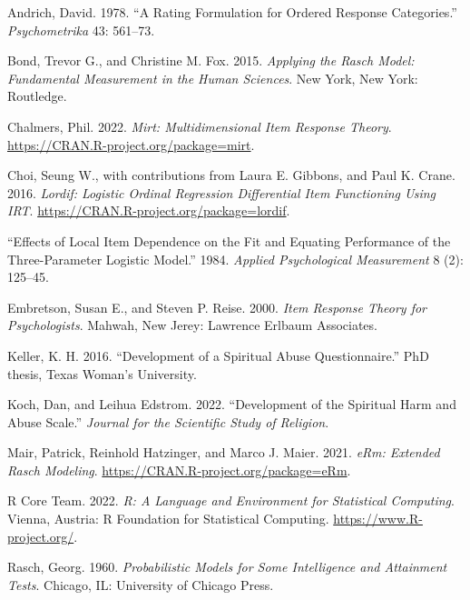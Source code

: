 \documentclass[
  letterpaper,
  DIV=11,
  numbers=noendperiod]{scrreport}
\newlength{\cslhangindent}
\newlength{\cslentryspacingunit} %
\newenvironment{CSLReferences}[2] %
 {%
  \setlength{\parindent}{0pt}
  \ifodd #1
  \let\oldpar\par
  \def\par{\hangindent=\cslhangindent\oldpar}
  \fi
  \setlength{\parskip}{#2\cslentryspacingunit}
 }%
 {}
\begin{document}
\hypertarget{refs}{}
\begin{CSLReferences}{1}{0}
\leavevmode{}%
Andrich, David. 1978. {``A Rating Formulation for Ordered Response
Categories.''} \emph{Psychometrika} 43: 561--73.

\leavevmode{}%
Bond, Trevor G., and Christine M. Fox. 2015. \emph{Applying the Rasch
Model: Fundamental Measurement in the Human Sciences}. New York, New
York: Routledge.

\leavevmode{}%
Chalmers, Phil. 2022. \emph{Mirt: Multidimensional Item Response
Theory}. \url{https://CRAN.R-project.org/package=mirt}.

\leavevmode{}%
Choi, Seung W., with contributions from Laura E. Gibbons, and Paul K.
Crane. 2016. \emph{Lordif: Logistic Ordinal Regression Differential Item
Functioning Using IRT}. \url{https://CRAN.R-project.org/package=lordif}.

\leavevmode{}%
{``Effects of Local Item Dependence on the Fit and Equating Performance
of the Three-Parameter Logistic Model.''} 1984. \emph{Applied
Psychological Measurement} 8 (2): 125--45.

\leavevmode{}%
Embretson, Susan E., and Steven P. Reise. 2000. \emph{Item Response
Theory for Psychologists}. Mahwah, New Jerey: Lawrence Erlbaum
Associates.

\leavevmode{}%
Keller, K. H. 2016. {``Development of a Spiritual Abuse
Questionnaire.''} PhD thesis, Texas Woman's University.

\leavevmode{}%
Koch, Dan, and Leihua Edstrom. 2022. {``Development of the Spiritual
Harm and Abuse Scale.''} \emph{Journal for the Scientific Study of
Religion}.

\leavevmode{}%
Mair, Patrick, Reinhold Hatzinger, and Marco J. Maier. 2021. \emph{eRm:
Extended Rasch Modeling}. \url{https://CRAN.R-project.org/package=eRm}.

\leavevmode{}%
R Core Team. 2022. \emph{R: A Language and Environment for Statistical
Computing}. Vienna, Austria: R Foundation for Statistical Computing.
\url{https://www.R-project.org/}.

\leavevmode{}%
Rasch, Georg. 1960. \emph{Probabilistic Models for Some Intelligence and
Attainment Tests}. Chicago, IL: University of Chicago Press.


\end{CSLReferences}
\end{document}
